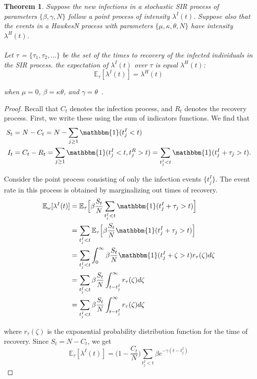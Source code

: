 \documentclass[12pt]{article}
\newtheorem{theorem}{Theorem}
\begin{document}
\begin{theorem}\label{Thrm1}
Suppose the new infections in a stochastic SIR process of parameters $\{\beta, \gamma, N\}$ follow a point process of intensity $\lambda^I(t)$. Suppose also that the events in a HawkesN process with parameters $\{\mu, \kappa, \theta, N\}$ have intensity $\lambda^H (t)$. 
\\
\\
Let $\tau$ = $\{\tau_1, \tau_2, \ldots \}$ be the set of the times to recovery of the infected individuals in the SIR process. the expectation of $\lambda^I (t)$ over $\tau$ is equal $\lambda^H (t)$:
\[
\mathbb{E}_\tau [ \lambda^I (t)] = \lambda^H (t)\]

when $\mu = 0$, $\beta = \kappa \theta$, and $\gamma = \theta$~\cite{Rizoiu2018}. 
\end{theorem}



\begin{proof} Recall that $C_t$ denotes the infection process, and $R_t$ denotes the recovery process. First, we write these using the sum of indicators functions. We find that
\begin{align*}
S_t &= N - C_t = N - \sum_{j\geq 1} \mathbbm{1} (t_j^I < t) \\
I_t &= C_t - R_t = \sum_{j\geq 1} \mathbbm{1} (t_j^I < t, t_j^R > t) = \sum_{t_j^I < t} \mathbbm{1} (t_j^I + \tau_j > t). 
\end{align*} 
 
Consider the point process consisting of only the infection events $\{t_j^I\}$. The event rate in this process is obtained by marginalizing out times of recovery. 
\begin{align*}
\mathbb{E}_\omega [ \lambda^I (t)] 
&= \mathbb{E}_\tau \Big [\beta \frac{S_t}{N} \sum_{t_j^I < t} \mathbbm{1} (t_j^I + \tau_j > t) \Big ]\\ 
&= \sum_{t_j^I < t} \mathbb{E}_\tau \Big [\beta \frac{S_t}{N}  \mathbbm{1} (t_j^I + \tau_j > t) \Big ]\\
&= \sum_{t_j^I < t}\int_0^\infty \beta \frac{S_t}{N}  \mathbbm{1} (t_j^I + \zeta > t) r_\tau(\zeta) d\zeta \\
&= \sum_{t_j^I < t} \beta \frac{S_t}{N} \int_{t - t_j^I}^\infty r_\tau(\zeta) d\zeta \\
&= \sum_{t_j^I < t} \beta \frac{S_t}{N} \int_{t - t_j^I}^\infty r_\tau(\zeta) d\zeta
\end{align*}
 
where $r_\tau(\zeta)$ is the exponential probability distribution function for the time of recovery. Since $S_t = N - C_t$, we get
\[
\mathbb{E}_\tau [ \lambda^I (t)] = \Big (1 - \frac{C_t}{N} \Big ) \sum_{t_j^I < t}  \beta e^{- \gamma (t - t_j^I)}
\] 
 
 
 
\end{proof}
\end{document}
